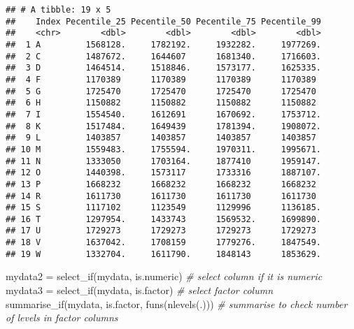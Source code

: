 \documentclass[
]{article}
\newenvironment{Shaded}{\begin{snugshade}}{\end{snugshade}}
\newcommand{\AttributeTok}[1]{\textcolor[rgb]{0.77,0.63,0.00}{#1}}
\newcommand{\CommentTok}[1]{\textcolor[rgb]{0.56,0.35,0.01}{\textit{#1}}}
\newcommand{\DecValTok}[1]{\textcolor[rgb]{0.00,0.00,0.81}{#1}}
\newcommand{\FunctionTok}[1]{\textcolor[rgb]{0.00,0.00,0.00}{#1}}
\newcommand{\NormalTok}[1]{#1}
\newcommand{\OtherTok}[1]{\textcolor[rgb]{0.56,0.35,0.01}{#1}}
\newcommand{\SpecialCharTok}[1]{\textcolor[rgb]{0.00,0.00,0.00}{#1}}
\begin{document}
\begin{verbatim}
## # A tibble: 19 x 5
##    Index Pecentile_25 Pecentile_50 Pecentile_75 Pecentile_99
##    <chr>        <dbl>        <dbl>        <dbl>        <dbl>
##  1 A         1568128.     1782192.     1932282.     1977269.
##  2 C         1487672.     1644607      1681340.     1716603.
##  3 D         1464514.     1518846.     1573177.     1625335.
##  4 F         1170389      1170389      1170389      1170389 
##  5 G         1725470      1725470      1725470      1725470 
##  6 H         1150882      1150882      1150882      1150882 
##  7 I         1554540.     1612691      1670692.     1753712.
##  8 K         1517484.     1649439      1781394.     1908072.
##  9 L         1403857      1403857      1403857      1403857 
## 10 M         1559483.     1755594.     1970311.     1995671.
## 11 N         1333050      1703164.     1877410      1959147.
## 12 O         1440398.     1573117      1733316      1887107.
## 13 P         1668232      1668232      1668232      1668232 
## 14 R         1611730      1611730      1611730      1611730 
## 15 S         1117102      1123549      1129996      1136185.
## 16 T         1297954.     1433743      1569532.     1699890.
## 17 U         1729273      1729273      1729273      1729273 
## 18 V         1637042.     1708159      1779276.     1847549.
## 19 W         1332704.     1611790.     1848143      1853629.
\end{verbatim}

\begin{Shaded}
\end{Shaded}

\begin{Shaded}
\begin{Highlighting}[]
\NormalTok{mydata2 }\OtherTok{=} \FunctionTok{select\_if}\NormalTok{(mydata, is.numeric) }\CommentTok{\# select column if it is numeric}
\NormalTok{mydata3 }\OtherTok{=} \FunctionTok{select\_if}\NormalTok{(mydata, is.factor) }\CommentTok{\# select factor column}
\FunctionTok{summarise\_if}\NormalTok{(mydata, is.factor, }\FunctionTok{funs}\NormalTok{(}\FunctionTok{nlevels}\NormalTok{(.))) }\CommentTok{\# summarise to check number of levels in factor columns}
\end{Highlighting}
\end{Shaded}
\end{document}

